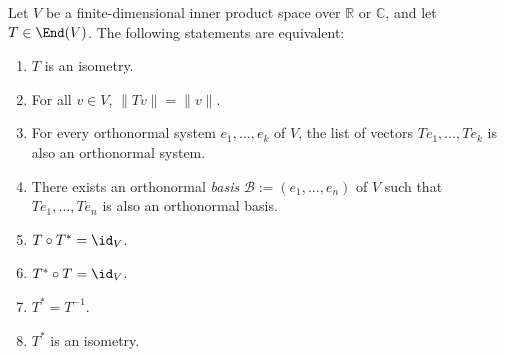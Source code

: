 \begin{theorem}
\label{thm:isometry_equivalences}
Let $V$ be a finite-di\-men\-sional inner product space over $\mathbb{R}$ or $\mathbb{C}$, and let $T \in \End(V)$. The following statements are equivalent:
\begin{enumerate}
    \item $T$ is an isometry.
    \item For all $v \in V$, $\|Tv\| = \|v\|$.
    \item For every orthonormal system $e_1, \dots, e_k$ of $V$, the list of vectors $Te_1, \dots, Te_k$ is also an orthonormal system.
    \item There exists an orthonormal \emph{basis} $\mathcal{B} := (e_1, \dots, e_n)$ of $V$ such that $Te_1, \dots, Te_n$ is also an orthonormal basis.
    \item $T \circ T^* = \id_V$.
    \item $T^* \circ T = \id_V$.
    \item $T^* = T^{-1}$.
    \item $T^*$ is an isometry.
\end{enumerate}
\end{theorem}

